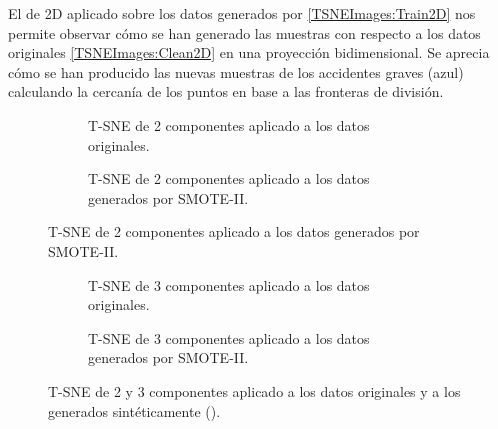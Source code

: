             El  de 2D aplicado sobre los datos generados por  \eqref{TSNEImages:Train2D} nos permite observar cómo se han generado las muestras con respecto a los datos originales \eqref{TSNEImages:Clean2D} en una proyección bidimensional. Se aprecia cómo se han producido las nuevas muestras de los accidentes graves (azul) calculando la cercanía de los puntos en base a las fronteras de división.


            \begin{figure}[H]
                \centering
                \begin{subfigure}[b]{0.4\textwidth}
                    \centering
                    
                    \caption{T-SNE de 2 componentes aplicado a los datos originales.}
                    \label{TSNEImages:Clean2D}
                \end{subfigure}
                \begin{subfigure}[b]{0.4\textwidth}
                    \centering
                    
                    \caption{T-SNE de 2 componentes aplicado a los datos generados por SMOTE-II.}
                    \label{TSNEImages:Train2D}

                \end{subfigure}
            \end{figure}%
            \begin{figure}[H]\ContinuedFloat
                \centering
                \begin{subfigure}[b]{0.4\textwidth}
                    \centering
                    
                    \caption{T-SNE de 3 componentes aplicado a los datos originales.}
                    \label{TSNEImages:Clean3D}
                \end{subfigure}
                \begin{subfigure}[b]{0.4\textwidth}
                    \centering
                    
                    \caption{T-SNE de 3 componentes aplicado a los datos generados por SMOTE-II.}
                    \label{TSNEImages:Train3D}
                \end{subfigure}
                \caption{T-SNE de 2 y 3 componentes aplicado a los datos originales y a los generados sintéticamente ().}
                \label{TSNEImages}
             \end{figure}



